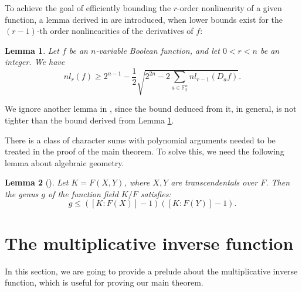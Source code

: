\documentclass{article}
\newcommand{\F}{\mathbb{F}}
\newcommand{\0}{\textbf{0}}
\newcommand{\1}{\textbf{1}}
\newcommand{\B}{\mathcal{B}}
\newcommand{\TrN}{\operatorname{Tr}_1^n}
\theoremstyle{plain}
\newtheorem{lemma}{Lemma}
\begin{document}
    To achieve the goal of efficiently bounding the $ r $-order nonlinearity of a given function, a lemma derived in \cite{Carlet2008lowbound_NL_profile} are introduced, when lower bounds exist for the $ (r-1) $-th order nonlinearities of the derivatives of $ f $: 
    \begin{lemma}\label{thm:High_order_nl_bound1}
        Let $ f $ be an $ n $-variable Boolean function, and let $ 0<r<n $ be an integer. We have 
        \[nl_r(f)\ge 2^{n-1}-\frac{1}{2}\sqrt{2^{2n}-2\sum_{a\in\F_2^n}nl_{r-1}(D_af)}.\] 
    \end{lemma}
    We ignore another lemma in \cite{Carlet2008lowbound_NL_profile}, since the bound deduced from it, in general, is not tighter than the bound derived from Lemma \ref{thm:High_order_nl_bound1}.
    
    There is a class of character sums with polynomial arguments needed to be treated in the proof of the main theorem.  
    To solve this, we need the following lemma about algebraic geometry. 
    \begin{lemma}[\cite{Stichtenoth2008book_algebraicfunctionfieldsandcodes}]\label{L:genus_K_F}
        Let $ K=F(X,Y) $, where $ X,Y $ are transcendentals over $ F $. 
        Then the genus $ g $ of the function field $ K/F $ satisfies: 
        \[g\le ([K : F(X)] - 1)([K : F(Y)] - 1).\]
    \end{lemma}



\section{The multiplicative inverse function}
    In this section, we are going to provide a prelude about the multiplicative inverse function, which is useful for proving our main theorem. 
\end{document}
